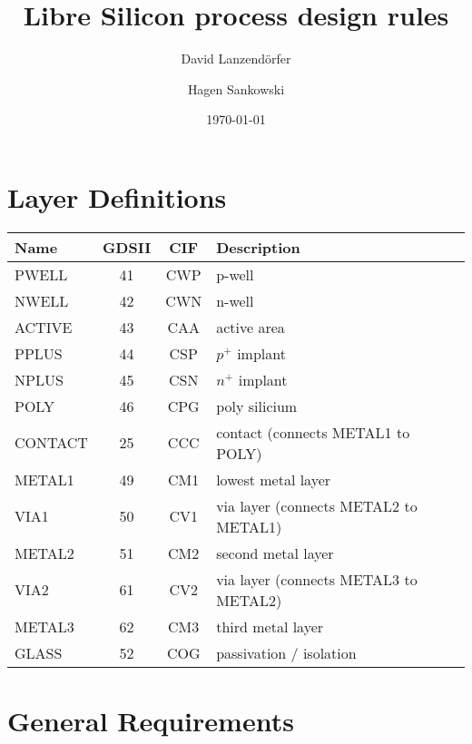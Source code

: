 \documentclass[10pt,a4paper,oneside]{article}
\title{Libre Silicon process design rules}
\date{\today}
\author{
  David Lanzendörfer
  \and
  Hagen Sankowski
}
\newcounter{ct}
\begin{document}
\begin{abstract}
	
\end{abstract}
\newpage
\maketitle
\section{Layer Definitions}\label{design_rules_layer_definitions}

\begin{center}
    \begin{tabular}{|l|c|c|p{7.5cm}|}
    \hline
        \textbf{Name} & \textbf{GDSII} & \textbf{CIF} & \textbf{Description} \\
    \hline
        PWELL   & 41 & CWP & p-well \\
        NWELL   & 42 & CWN & n-well \\
        ACTIVE  & 43 & CAA & active area \\
        PPLUS   & 44 & CSP & $p^{+}$ implant \\
        NPLUS   & 45 & CSN & $n^{+}$ implant \\
        POLY    & 46 & CPG & poly silicium \\
        CONTACT & 25 & CCC & contact (connects METAL1 to POLY) \\
        METAL1  & 49 & CM1 & lowest metal layer \\
        VIA1    & 50 & CV1 & via layer (connects METAL2 to METAL1) \\
        METAL2  & 51 & CM2 & second metal layer \\
        VIA2    & 61 & CV2 & via layer (connects METAL3 to METAL2) \\
        METAL3  & 62 & CM3 & third metal layer \\
        GLASS   & 52 & COG & passivation / isolation \\
    \hline
    \end{tabular}
\end{center}

\section{General Requirements}\label{design_rules_general_requirements}
\end{document}
